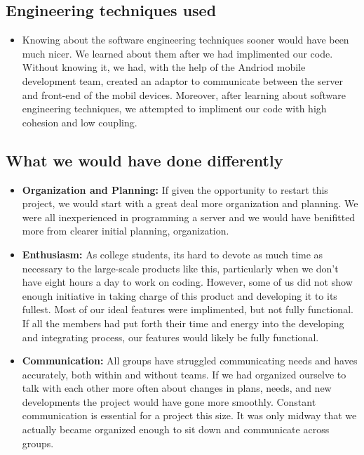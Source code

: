 \documentclass[letterpaper,12pt]{article}
\begin{document}
\begin{itemize}
\end{itemize}

\subsection{Engineering techniques used}
\begin{itemize}
\item Knowing about the software engineering techniques sooner would have been much nicer. We learned about them after we had implimented our code. Without knowing it, we had, with the help of the Andriod mobile development team, created an adaptor to communicate between the server and front-end of the mobil devices.
Moreover, after learning about software engineering techniques, we attempted to impliment our code with high cohesion and low coupling. 
\end{itemize}

\subsection{What we would have done differently}
\begin{itemize}
\item \textbf{Organization and Planning:} If given the opportunity to restart this project, we would start with a great deal more organization and planning. We were all inexperienced in programming a server and we would have benifitted more from clearer initial planning, organization.
\item \textbf{Enthusiasm:} As college students, its hard to devote as much time as necessary to the large-scale products like this, particularly when we don't have eight hours a day to work on coding. However, some of us did not show enough initiative in taking charge of this product and developing it to its fullest.  Most of our ideal features were implimented, but not fully functional. If all the members had put forth their time and energy into the developing and integrating process, our features would likely be fully functional.
\item \textbf{Communication:} All groups have struggled communicating needs and haves accurately, both within and without teams. If we had organized ourselve to talk with each other more often about changes in plans, needs, and new developments the project would have gone more smoothly. Constant communication is essential for a project this size. It was only midway that we actually became organized enough to sit down and communicate across groups.
\end{itemize}
\end{document}
